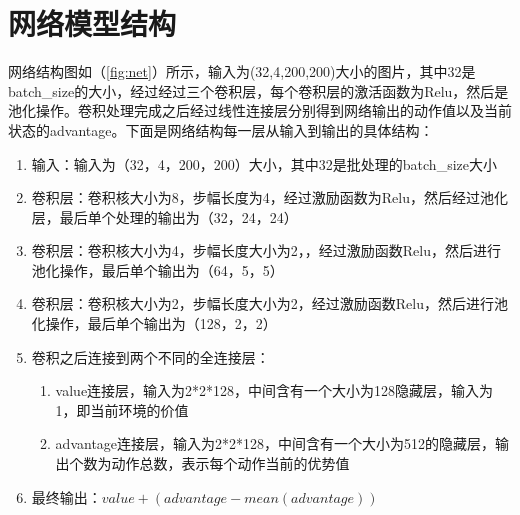 \section{网络模型结构}

网络结构图如（\ref{fig:net}）所示，输入为(32,4,200,200)大小的图片，其中32是batch\_size的大小，经过经过三个卷积层，每个卷积层的激活函数为Relu，然后是池化操作。卷积处理完成之后经过线性连接层分别得到网络输出的动作值以及当前状态的advantage。下面是网络结构每一层从输入到输出的具体结构：
\begin{enumerate}
  \item 输入：输入为（32，4，200，200）大小，其中32是批处理的batch\_size大小
  \item 卷积层：卷积核大小为8，步幅长度为4，经过激励函数为Relu，然后经过池化层，最后单个处理的输出为（32，24，24）
  \item 卷积层：卷积核大小为4，步幅长度大小为2，，经过激励函数Relu，然后进行池化操作，最后单个输出为（64，5，5）
  \item 卷积层：卷积核大小为2，步幅长度大小为2，经过激励函数Relu，然后进行池化操作，最后单个输出为（128，2，2）
  \item 卷积之后连接到两个不同的全连接层：
  \begin{enumerate}
    \item value连接层，输入为2*2*128，中间含有一个大小为128隐藏层，输入为1，即当前环境的价值
    \item advantage连接层，输入为2*2*128，中间含有一个大小为512的隐藏层，输出个数为动作总数，表示每个动作当前的优势值
  \end{enumerate}
  \item 最终输出：$value+(advantage-mean(advantage))$
\end{enumerate}
